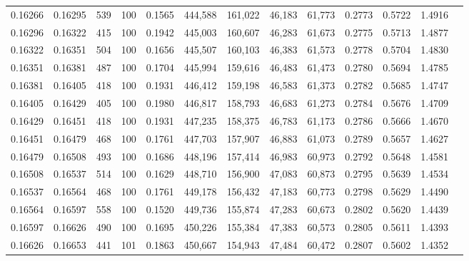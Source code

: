 \begin{tabular}{rrrrrrrrrrrrr}
0.16266 & 0.16295 &   539 & 100 &                                     0.1565 & 444,588 & 161,022 &  46,183 &  61,773 & 0.2773 & 0.5722 & 1.4916 \\
0.16296 & 0.16322 &   415 & 100 &                                     0.1942 & 445,003 & 160,607 &  46,283 &  61,673 & 0.2775 & 0.5713 & 1.4877 \\
0.16322 & 0.16351 &   504 & 100 &                                     0.1656 & 445,507 & 160,103 &  46,383 &  61,573 & 0.2778 & 0.5704 & 1.4830 \\
0.16351 & 0.16381 &   487 & 100 &                                     0.1704 & 445,994 & 159,616 &  46,483 &  61,473 & 0.2780 & 0.5694 & 1.4785 \\
0.16381 & 0.16405 &   418 & 100 &                                     0.1931 & 446,412 & 159,198 &  46,583 &  61,373 & 0.2782 & 0.5685 & 1.4747 \\
0.16405 & 0.16429 &   405 & 100 &                                     0.1980 & 446,817 & 158,793 &  46,683 &  61,273 & 0.2784 & 0.5676 & 1.4709 \\
0.16429 & 0.16451 &   418 & 100 &                                     0.1931 & 447,235 & 158,375 &  46,783 &  61,173 & 0.2786 & 0.5666 & 1.4670 \\
0.16451 & 0.16479 &   468 & 100 &                                     0.1761 & 447,703 & 157,907 &  46,883 &  61,073 & 0.2789 & 0.5657 & 1.4627 \\
0.16479 & 0.16508 &   493 & 100 &                                     0.1686 & 448,196 & 157,414 &  46,983 &  60,973 & 0.2792 & 0.5648 & 1.4581 \\
0.16508 & 0.16537 &   514 & 100 &                                     0.1629 & 448,710 & 156,900 &  47,083 &  60,873 & 0.2795 & 0.5639 & 1.4534 \\
0.16537 & 0.16564 &   468 & 100 &                                     0.1761 & 449,178 & 156,432 &  47,183 &  60,773 & 0.2798 & 0.5629 & 1.4490 \\
0.16564 & 0.16597 &   558 & 100 &                                     0.1520 & 449,736 & 155,874 &  47,283 &  60,673 & 0.2802 & 0.5620 & 1.4439 \\
0.16597 & 0.16626 &   490 & 100 &                                     0.1695 & 450,226 & 155,384 &  47,383 &  60,573 & 0.2805 & 0.5611 & 1.4393 \\
0.16626 & 0.16653 &   441 & 101 &                                     0.1863 & 450,667 & 154,943 &  47,484 &  60,472 & 0.2807 & 0.5602 & 1.4352 \\

\end{tabular}

